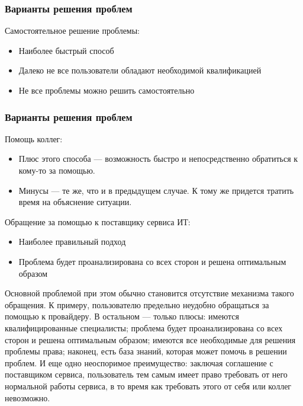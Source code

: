 \documentclass{../industrial-development}
\begin{document}
\begin{frame} \frametitle{Варианты решения проблем}
Самостоятельное решение проблемы:
	\begin{itemize} 
		\item Наиболее быстрый способ 
		\item Далеко не все пользователи обладают необходимой квалификацией
		\item Не все проблемы можно решить самостоятельно
	\end{itemize}
\end{frame}

\lecturenotes

\begin{frame} \frametitle{Варианты решения проблем}
Помощь коллег:
\begin{itemize} 
		\item Плюс этого способа --- возможность быстро и непосредственно обратиться к кому-то за помощью. 
		\item Минусы --- те же, что и в предыдущем случае. К тому же придется тратить время на объяснение ситуации.
	\end{itemize}
Обращение за помощью к поставщику сервиса ИТ:
	\begin{itemize} 
		\item Наиболее правильный подход
		\item Проблема будет проанализирована со всех сторон и решена оптимальным образом
	\end{itemize}
\end{frame}

\lecturenotes
Основной проблемой при этом обычно становится отсутствие механизма такого обращения. К примеру, пользователю предельно неудобно обращаться за помощью к провайдеру.  
В остальном — только плюсы: имеются квалифицированные специалисты; проблема будет проанализирована со всех сторон и решена оптимальным образом; имеются все необходимые для решения проблемы права; наконец, есть база знаний, которая может помочь в решении проблем. И еще одно неоспоримое преимущество: заключая соглашение с поставщиком сервиса, пользователь тем самым имеет право требовать от него нормальной работы сервиса, в то время как требовать этого от себя или коллег невозможно.

\end{document}
